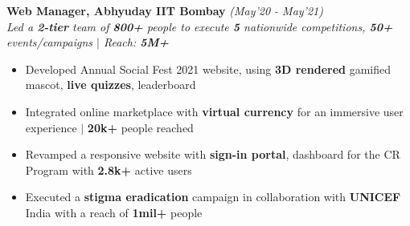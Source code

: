 \documentclass[10.5pt]{article}
\begin{document}
	\textbf{\large Web Manager, Abhyuday IIT Bombay}
	\hfill{\sl \small (May'20 - May'21) }\\
	\vspace{12pt}
	\hspace{-8pt}
\textit{Led a \textbf{2-tier} team of \textbf{800+} people to execute \textbf{5} nationwide competitions, \textbf{50+} events/campaigns $|$ Reach: \textbf{5M+} }
\vspace{-17 pt}
    \begin{itemize}[itemsep = -1.45mm, leftmargin=*]
    
            
        \item Developed Annual Social Fest 2021 website, using \textbf{3D rendered} gamified mascot, \textbf{live quizzes}, leaderboard 
        
        \item Integrated online marketplace with \textbf{virtual currency} for an immersive user experience $|$ \textbf{20k+} people reached
        
        \item Revamped a responsive website with \textbf{sign-in portal}, dashboard for the CR Program with \textbf{2.8k+} active users
        
        \item Executed a \textbf{stigma eradication} campaign in collaboration with \textbf{UNICEF} India with a reach of \textbf{1mil+} people
        
        
        
    \end{itemize}
	
\end{document}
